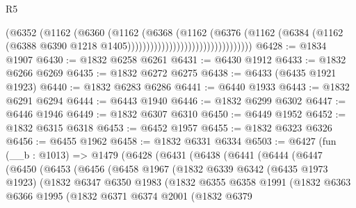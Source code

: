\begin{lexlean}{R5}
\begin{coremodule}
                                                (@6352
                                                  (@1162
                                                    (@6360
                                                      (@1162
                                                        (@6368
                                                          (@1162
                                                            (@6376
                                                              (@1162
                                                                (@6384
                                                                  (@1162
                                                                    (@6388
                                                                      @6390
                                                                      @1218
                                                                      @1405)))))))))))))))))))))))))))))))))
@6428 := @1834 @1907
@6430 := @1832 @6258 @6261
@6431 := @6430 @1912
@6433 := @1832 @6266 @6269
@6435 := @1832 @6272 @6275
@6438 := @6433 (@6435 @1921 @1923)
@6440 := @1832 @6283 @6286
@6441 := @6440 @1933
@6443 := @1832 @6291 @6294
@6444 := @6443 @1940
@6446 := @1832 @6299 @6302
@6447 := @6446 @1946
@6449 := @1832 @6307 @6310
@6450 := @6449 @1952
@6452 := @1832 @6315 @6318
@6453 := @6452 @1957
@6455 := @1832 @6323 @6326
@6456 := @6455 @1962
@6458 := @1832 @6331 @6334
@6503 := @6427
    (fun (__b : @1013) =>
    @1479
      (@6428
        (@6431
          (@6438
            (@6441
              (@6444
                (@6447
                  (@6450
                    (@6453
                      (@6456
                        (@6458
                          @1967
                          (@1832
                            @6339
                            @6342
                            (@6435 @1973 @1923)
                            (@1832
                              @6347
                              @6350
                              @1983
                              (@1832
                                @6355
                                @6358
                                @1991
                                (@1832
                                  @6363
                                  @6366
                                  @1995
                                  (@1832
                                    @6371
                                    @6374
                                    @2001
                                    (@1832
                                      @6379

\end{coremodule}
\end{lexlean}
